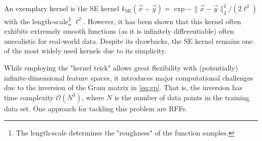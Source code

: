 	An exemplary kernel is the \ac{SE} kernel \( k_\mathrm{SE}(\vec{x} - \vec{y}) = \exp{ -\lVert \vec{x} - \vec{y} \rVert_2^2 / (2 \ell^2) } \) with the length-scale\footnote{The length-scale determines the "roughness" of the function samples\cite[p.\,15]{rasmussenGaussianProcessesMachine2006}.} \(\ell^2\).
	However, it has been shown that this kernel often exhibits extremely smooth functions (as it is infinitely differentiable) often unrealistic for real-world data\cite{steinInterpolationSpatialData1999}.
	Despite its drawbacks, the \ac{SE} kernel remains one of the most widely used kernels due to its simplicity\cite[p.\,83]{rasmussenGaussianProcessesMachine2006}.

	While employing the "kernel trick" allows great flexibility with (potentially) infinite-dimensional feature spaces, it introduces major computational challenges due to the inversion of the Gram matrix in \cref{eq:gp}.
	That is, the inversion has time complexity \( \mathcal{O}(N^3) \), where \(N\) is the number of data points in the training data set.
	One approach for tackling this problem are \aclp{RFF}.
